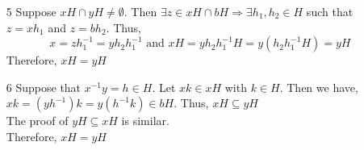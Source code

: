 \documentclass[12pt]{article}
\begin{document}
	
	\begin{enumerate}
		\item[5]
		Suppose $ xH \cap yH \not = \emptyset $. Then $ \exists z \in xH \cap bH \Rightarrow \exists h_1,h_2\in H $ such that $ z = xh_1 $ and $ z=bh_2 $. Thus,
		 \[x=zh_1^{-1}=yh_2h_1^{-1} \text{ and } xH=yh_2h_1^{-1}H=y(h_2h_1^{-1}H)=yH\]
		 Therefore, $ xH = yH $
		 \item[6]
		 Suppose that $ x^{-1}y =h \in H$. Let $ xk \in xH $ with $ k \in H $. Then we have, $ xk = (yh^{-1})k = y(h^{-1}k)\in bH $. Thus, $ xH \subseteq yH $\\
		 The proof of $ yH\subseteq xH $ is similar.\\
		 Therefore, $ xH = yH $
	 	\end{enumerate}
\end{document}
